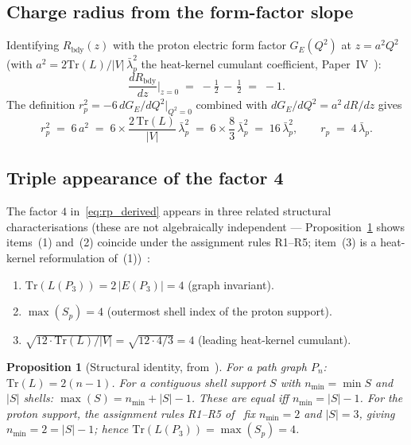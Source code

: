 \documentclass[12pt]{article}
\newtheorem{proposition}[theorem]{Proposition}
\newcommand{\lbar}{\bar{\lambda}}
\begin{document}
\subsection*{Charge radius from the form-factor slope}

Identifying $R_{\mathrm{bdy}}(z)$ with the proton electric form factor
$G_E(Q^2)$ at $z = a^2 Q^2$ (with $a^2 = 2\mathrm{Tr}(L)/|V|\,\lbar_p^2$
the heat-kernel cumulant coefficient, Paper~IV~\citep{SmartIV}):
\begin{equation}\label{eq:dR}
    \frac{dR_{\mathrm{bdy}}}{dz}\bigg|_{z=0} \;=\; -\tfrac{1}{2} \,-\, \tfrac{1}{2} \;=\; -1.
\end{equation}
The definition $r_p^2 = -6\,dG_E/dQ^2|_{Q^2 = 0}$ combined with
$dG_E/dQ^2 = a^2\,dR/dz$ gives
\begin{equation}\label{eq:rp_derived}
    r_p^2 \;=\; 6\,a^2 \;=\; 6 \times \frac{2\,\mathrm{Tr}(L)}{|V|}\,\lbar_p^2
    \;=\; 6 \times \frac{8}{3}\,\lbar_p^2 \;=\; 16\,\lbar_p^2,
    \qquad r_p \;=\; 4\,\lbar_p.
\end{equation}

\subsection*{Triple appearance of the factor 4}

The factor $4$ in~\eqref{eq:rp_derived} appears in three related structural characterisations (these are not algebraically independent --- Proposition~\ref{prop:triple} shows items~(1) and~(2) coincide under the assignment rules R1--R5; item~(3) is a heat-kernel reformulation of~(1))~\citep{SmartRadius}:
\begin{enumerate}
    \item $\mathrm{Tr}(L(P_3)) = 2\,|E(P_3)| = 4$ (graph invariant).
    \item $\max(S_p) = 4$ (outermost shell index of the proton support).
    \item $\sqrt{12 \cdot \mathrm{Tr}(L)/|V|} = \sqrt{12 \cdot 4/3} = 4$ (leading heat-kernel cumulant).
\end{enumerate}

\begin{proposition}[Structural identity, from~\citep{SmartRadius}]\label{prop:triple}
For a path graph $P_n$: $\mathrm{Tr}(L) = 2(n-1)$. For a contiguous
shell support $S$ with $n_{\min} = \min S$ and $|S|$ shells:
$\max(S) = n_{\min} + |S| - 1$. These are equal iff
$n_{\min} = |S| - 1$. For the proton support, the assignment rules
R1--R5 of~\citep{SmartRadius} fix $n_{\min} = 2$ and $|S| = 3$,
giving $n_{\min} = 2 = |S| - 1$; hence
$\mathrm{Tr}(L(P_3)) = \max(S_p) = 4$.
\end{proposition}
\end{document}
